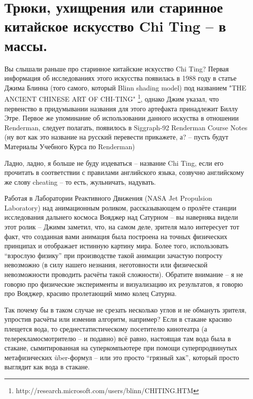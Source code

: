 \chapter*{Трюки, ухищрения или старинное китайское искусство Chi Ting – в массы.}
  

 Вы слышали раньше про старинное китайские искусство
    Chi Ting? Первая информация об исследованиях этого искусства
    появилась в 1988 году в статье Джима Блинна (того самого, который
    Blinn shading model) под названием "THE ANCIENT CHINESE ART OF
    CHI-TING" \footnote{http://research.microsoft.com/users/blinn/CHITING.HTM},
    однако Джим указал, что первенство в придумывании названия для
    этого артефакта принадлежит Биллу Этре. Первое же упоминание об
    использовании данного искуства в отношении Renderman, следует
    полагать, появилось в Siggraph-92 Renderman Course Notes (ну вот
    как это название на русский перевести прикажете, а? – пусть будут
    Материалы Учебного Курса по Renderman)
  

 Ладно, ладно, я больше не буду издеваться –
    название Chi Ting, если его прочитать в соответствии с правилами
    английского языка, созвучно английскому же слову cheating – то
    есть, жульничать, надувать.
  

 Работая в Лаборатории Реактивного Движения (NASA
    Jet Propulsion Laboratory) над анимационным роликом, рассказывающем
    о пролёте станции исследования дальнего космоса Вояджер над
    Сатурном – вы наверняка видели этот ролик – Джимм заметил, что, на
    самом деле, зрителя мало интересует тот факт, что созданная вами
    анимация была построена на точных физических принципах и отображает
    истинную картину мира. Более того, использовать “взрослую физику”
    при производстве такой анимации зачастую попросту невозможно (в
    силу нашего незнания, неготовности или физической невозможности
    проводить расчёты такой сложности). Обратите внимание – я не говорю
    про физические эксперименты и визуализацию их результатов, я говорю
    про Вояджер, красиво пролетающий мимо колец Сатурна.
  

 Так почему бы в таком случае не срезать несколько
    углов и не обмануть зрителя, упростив расчёты или изменив алгоритм,
    например? Если в стакане красиво плещется вода, то
    среднестатистическому посетителю кинотеатра (а
    телерекламосмотрителю – и подавно) всё равно, настоящая там вода
    была в стакане, сымитированная на суперкомпьютере при помощи
    суперпродвинутых метафизических über-формул – или это просто
    “грязный хак”, который просто выглядит как вода в
    стакане.
  

